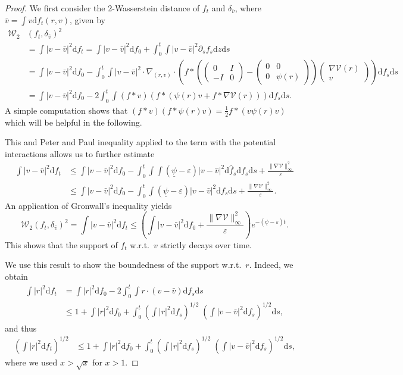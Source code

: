 \documentclass[11pt]{article}
\newcommand{\dd}[0]{\mathrm d}
\newcommand{\V}[0]{\mathcal V}
\begin{document}
\begin{bibunit}[abbrv]
\begin{proof}
We first consider the 2-Wasserstein distance of $f_t$ and $\delta_{\bar v}$, where $\bar v = \int v \dd f_t(r,v)$, given by
\begin{align*}
\mathcal W_2&(f_t, \delta_{\bar v})^2\\ &= \int |v - \bar v|^2 \dd f_t = \int |v-\bar v|^2 \dd f_0 + \int_0^t \int  |v- \bar v|^2 \partial_s f_s \dd z \dd s \\
&=  \int |v-\bar v|^2 \dd f_0 - \int_0^t \int  |v- \bar v|^2 \cdot \nabla_{(r,v)} \cdot \left( f \ast \left(\begin{pmatrix} 0 & I \\ -I & 0 \end{pmatrix} -\begin{pmatrix} 0 & 0 \\ 0 & \psi(r) \end{pmatrix}\right) \begin{pmatrix} \nabla \V(r) \\ v \end{pmatrix} \right) \dd f_s \dd s \\
&= \int |v-\bar v|^2 \dd f_0 - 2 \int_0^t \int (f\ast v) (f\ast (\psi(r)v + f \ast \nabla \V(r) )) \dd f_s \dd s. 
\end{align*}
A simple computation shows that $(f\ast v) (f\ast \psi(r) v) = \frac12 f\ast (v\psi(r)v)$ which will be helpful in the following. 


This and Peter and Paul inequality applied to the term with the potential interactions allows us to further estimate
\begin{align*}
\int |v - \bar v|^2 \dd f_t  &\le   \int |v-\bar v|^2 \dd f_0 - \int_0^t  \int \int (\underline{\psi} - \varepsilon) |v - \hat v|^2 \dd \hat f_s \dd f_s \dd s + \frac{\| \nabla \V \|_\infty^2}{\varepsilon} \\
&\le \int |v-\bar v|^2 \dd f_0 - \int_0^t   \int (\underline{\psi} - \varepsilon) |v - \bar v|^2 \dd f_s  \dd s + \frac{\| \nabla \V \|_\infty^2}{\varepsilon}.
\end{align*}
An application of Gronwall's inequality yields
\[
\mathcal W_2(f_t, \delta_{\bar v})^2 = \int |v - \bar v|^2 \dd f_t \le \left(\int |v-\bar v|^2 \dd f_0+\frac{\| \nabla \V \|_\infty^2}{\varepsilon} \right) e^{-(\underline{\psi} - \varepsilon)t}.
\]
This shows that the support of $f_t$ w.r.t.~$v$ strictly decays over time.

We use this result to show the boundedness of the support w.r.t.~$r$. Indeed, we obtain
\begin{align*}
\int |r|^2 \dd f_t &= \int |r|^2 \dd f_0 - 2 \int_0^t \int r  \cdot (v- \bar v) \dd f_s \dd s \\
&\le 1+\int |r|^2 \dd f_0 + \int_0^t \left(\int |r|^2 \dd f_s\right)^{1/2} \; \left(\int |v- \bar v|^2 \dd f_s\right)^{1/2} \dd s,  
\end{align*}
and thus 
\begin{align*}
\left(\int |r|^2 \dd f_t\right)^{1/2} 
&\le 1+ \int |r|^2 \dd f_0 + \int_0^t \left(\int |r|^2 \dd f_s\right)^{1/2} \; \left(\int |v- \bar v|^2 \dd f_s\right)^{1/2} \dd s,
\end{align*}
where we used $x > \sqrt{x}$ for $x>1$.


\end{proof}
\end{bibunit}
\end{document}
